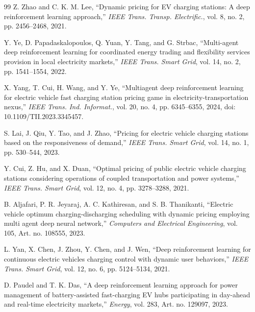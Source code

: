 \documentclass[10pt,journal]{IEEEtran}
\begin{document}
\begin{thebibliography}{99}
Z. Zhao and C. K. M. Lee,
``Dynamic pricing for EV charging stations: A deep reinforcement learning
approach,''
\emph{IEEE Trans. Transp. Electrific.}, vol. 8, no. 2, pp. 2456--2468, 2021.

Y. Ye, D. Papadaskalopoulos, Q. Yuan, Y. Tang, and G. Strbac,
``Multi-agent deep reinforcement learning for coordinated energy trading and
flexibility services provision in local electricity markets,''
\emph{IEEE Trans. Smart Grid}, vol. 14, no. 2, pp. 1541--1554, 2022.

X. Yang, T. Cui, H. Wang, and Y. Ye,
``Multiagent deep reinforcement learning for electric vehicle fast charging
station pricing game in electricity-transportation nexus,''
\emph{IEEE Trans. Ind. Informat.}, vol. 20, no. 4, pp. 6345--6355, 2024,
doi: 10.1109/TII.2023.3345457.

S. Lai, J. Qiu, Y. Tao, and J. Zhao,
``Pricing for electric vehicle charging stations based on the responsiveness
of demand,''
\emph{IEEE Trans. Smart Grid}, vol. 14, no. 1, pp. 530--544, 2023.

Y. Cui, Z. Hu, and X. Duan,
``Optimal pricing of public electric vehicle charging stations considering
operations of coupled transportation and power systems,''
\emph{IEEE Trans. Smart Grid}, vol. 12, no. 4, pp. 3278--3288, 2021.

B. Aljafari, P. R. Jeyaraj, A. C. Kathiresan, and S. B. Thanikanti,
``Electric vehicle optimum charging-discharging scheduling with dynamic
pricing employing multi agent deep neural network,''
\emph{Computers and Electrical Engineering}, vol. 105, Art. no. 108555, 2023.

L. Yan, X. Chen, J. Zhou, Y. Chen, and J. Wen,
``Deep reinforcement learning for continuous electric vehicles charging
control with dynamic user behaviors,''
\emph{IEEE Trans. Smart Grid}, vol. 12, no. 6, pp. 5124--5134, 2021.

D. Paudel and T. K. Das,
``A deep reinforcement learning approach for power management of
battery-assisted fast-charging EV hubs participating in day-ahead and
real-time electricity markets,''
\emph{Energy}, vol. 283, Art. no. 129097, 2023.

\end{thebibliography}
\end{document}
